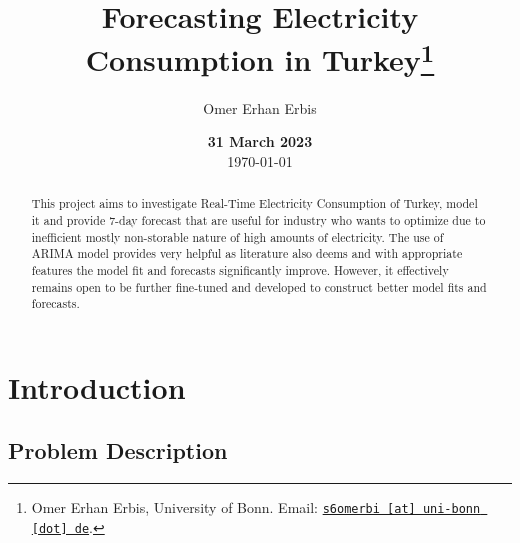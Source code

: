 \documentclass[11pt, a4paper, leqno]{article}
\begin{document}
\title{Forecasting Electricity Consumption in Turkey\thanks{Omer Erhan Erbis, University of Bonn. Email: \href{mailto:s6omerbi@uni-bonn.de}{\nolinkurl{s6omerbi [at] uni-bonn [dot] de}}.}}

\author{Omer Erhan Erbis}

\date{
    {\bf 31 March 2023}
    \\[1ex]
    \today
}

\maketitle


\begin{abstract}
    This project aims to investigate Real-Time Electricity Consumption of Turkey, model it and provide 7-day forecast that are useful for industry who wants to optimize due to inefficient mostly non-storable nature of high amounts of electricity. The use of ARIMA model provides very helpful as literature also deems and with appropriate features the model fit and forecasts significantly improve. However, it effectively remains open to be further fine-tuned and developed to construct better model fits and forecasts.
\end{abstract}

\clearpage


\section{Introduction} %
\label{sec:introduction}

\subsection{Problem Description}
\label{subsec:problem}

\begin{comment}
If you are using this template, please cite this item from the references:
\citet{GaudeckerEconProjectTemplates}.
\end{comment}
\end{document}
